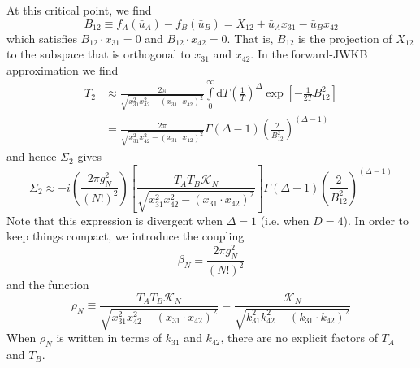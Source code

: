 At this critical point, we find
\begin{equation}
	B_{12} \equiv f_{A}(\bar{u}_{A}) - f_{B}(\bar{u}_{B}) = X_{1 2} + \bar{u}_{A} x_{3 1} - \bar{u}_{B} x_{4 2}
\end{equation}
which satisfies $B_{12} \cdot x_{31} = 0$ and $B_{12} \cdot x_{42} = 0$. That is, $B_{12}$ is the projection of $X_{12}$ to the subspace that is orthogonal to $x_{31}$ and $x_{42}$. In the forward-JWKB approximation we find
\begin{align}
	\Upsilon_{2} &\approx \frac{2 \pi}{\sqrt{x_{31}^{2} x_{42}^{2} - (x_{31} \cdot x_{42})^{2}}} \int\limits_{0}^{\infty}\mathrm{d}T \left( \frac{1}{T} \right)^{\Delta} \exp{\left[- \frac{1}{2 T} B_{1 2}^{2} \right]} \nonumber \\
	&= \frac{2 \pi}{\sqrt{x_{31}^{2} x_{42}^{2} - (x_{31} \cdot x_{42})^{2}}} \Gamma(\Delta - 1) \left( \frac{2}{B_{1 2}^{2}} \right)^{(\Delta - 1)}
\end{align}
and hence $\Sigma_{2}$ gives
\begin{equation}
	\Sigma_{2} \approx -i \left( \frac{2 \pi g_{N}^{2}}{(N!)^{2}} \right) \left[ \frac{T_{A} T_{B} \mathcal{K}_{N}}{\sqrt{x_{31}^{2} x_{42}^{2} - (x_{31} \cdot x_{42})^{2}}} \right] \Gamma(\Delta - 1) \left( \frac{2}{B_{1 2}^{2}} \right)^{(\Delta - 1)}
\end{equation}
Note that this expression is divergent when $\Delta = 1$ (i.e. when $D = 4$). In order to keep things compact, we introduce the coupling
\begin{equation}
	\beta_{N} \equiv \frac{2 \pi g_{N}^{2}}{(N!)^{2}} \label{betaN}
\end{equation}
and the function
\begin{equation}
	\rho_{N} \equiv \frac{T_{A} T_{B} \mathcal{K}_{N}}{\sqrt{x_{31}^{2} x_{42}^{2} - (x_{31} \cdot x_{42})^{2}}} = \frac{\mathcal{K}_{N}}{\sqrt{k_{31}^{2} k_{42}^{2} - (k_{31} \cdot k_{42})^{2}}}
\end{equation}
When $\rho_{N}$ is written in terms of $k_{31}$ and $k_{42}$, there are no explicit factors of $T_{A}$ and $T_{B}$.
